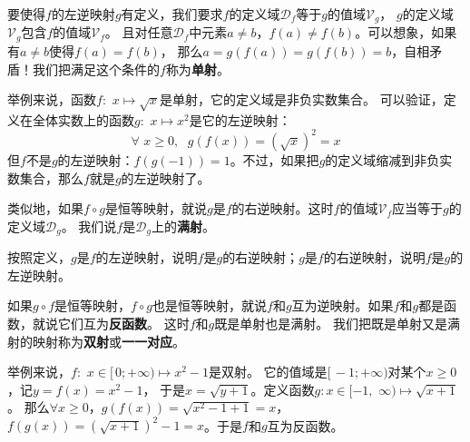 \documentclass[12pt,UTF8,fontset=none]{ctexbook}
\begin{document}
要使得$f$的左逆映射$g$有定义，我们要求$f$的定义域$\mathcal{D}_f$等于$g$的值域$\mathcal{V}_g$，
$g$的定义域$\mathcal{V}_g$包含$f$的值域$\mathcal{V}_f$。
且对任意$\mathcal{D}_f$中元素$a \neq b$，$f(a) \neq f(b)$。可以想象，如果有$a \neq b$使得$f(a) = f(b)$，
那么$a = g(f(a)) = g(f(b)) = b$，自相矛盾！我们把满足这个条件的$f$称为\textbf{单射}。

举例来说，函数$f: \,\,x \mapsto \sqrt{x}$是单射，它的定义域是非负实数集合。
可以验证，定义在全体实数上的函数$g:\,\, x \mapsto x^2$是它的左逆映射：
$$ \forall \,\, x \geqslant 0, \;\,\, g(f(x)) = \left(\sqrt{x}\right)^2 = x$$
但$f$不是$g$的左逆映射：$f(g(-1)) = 1$。不过，如果把$g$的定义域缩减到非负实数集合，那么$f$就是$g$的左逆映射了。

类似地，如果$f\circ g$是恒等映射，就说$g$是$f$的右逆映射。这时$f$的值域$\mathcal{V}_f$应当等于$g$的定义域$\mathcal{D}_g$。
我们说$f$是$\mathcal{D}_g$上的\textbf{满射}。

按照定义，$g$是$f$的左逆映射，说明$f$是$g$的右逆映射；$g$是$f$的右逆映射，说明$f$是$g$的左逆映射。

如果$g\circ f$是恒等映射，$f\circ g$也是恒等映射，就说$f$和$g$互为逆映射。如果$f$和$g$都是函数，就说它们互为\textbf{反函数}。
这时$f$和$g$既是单射也是满射。
我们把既是单射又是满射的映射称为\textbf{双射}或\textbf{一一对应}。

举例来说，$f: \,\,x\in[\,0;+\infty) \mapsto x^2 - 1$是双射。
它的值域是$[\,-1;+\infty)$对某个$x\geqslant 0$，记$y = f(x) = x^2 - 1$，
于是$x = \sqrt{y + 1}$。定义函数$g:x\in[-1, \,\,\infty)\mapsto\sqrt{x + 1}$。
那么$\forall x \geqslant 0$，$g(f(x)) = \sqrt{x^2 - 1 + 1} = x$，
$f(g(x)) = \left(\sqrt{x + 1}\right)^2 - 1 = x$。于是$f$和$g$互为反函数。
\end{document}
